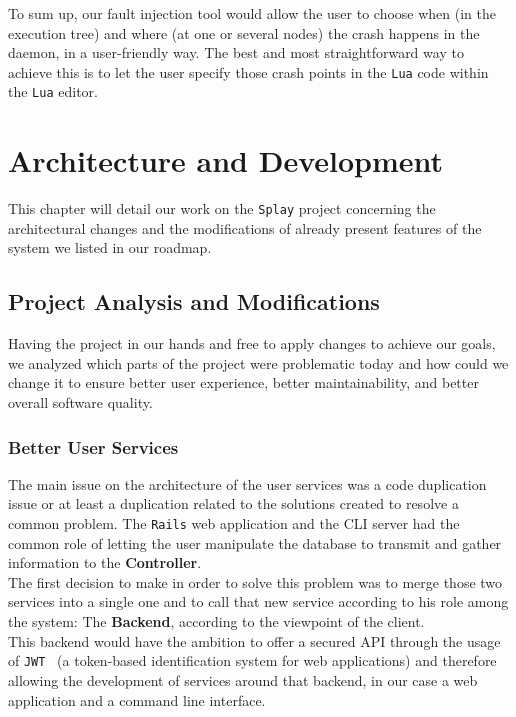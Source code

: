\documentclass{eplmastersthesis}
\begin{document}
          To sum up, our fault injection tool would allow the user to choose
          when (in the execution tree) and where (at one or several nodes) the
          crash happens in the daemon, in a user-friendly way. The best and
          most straightforward way to achieve this is to let
          the user specify those crash points in the \texttt{Lua} code within the \texttt{Lua}
          editor.

  \chapter{Architecture and Development}
  \label{chap:dev}

    This chapter will detail our work on the \texttt{Splay} project concerning the
    architectural changes and the modifications of already present features
    of the system we listed in our roadmap.

    \section{Project Analysis and Modifications}

      Having the project in our hands and free to apply changes to achieve our
      goals, we analyzed which parts of the project were problematic today and
      how could we change it to ensure better user experience, better
      maintainability, and better overall software quality.

      \subsection{Better User Services}

        The main issue on the architecture of the user services was a code
        duplication issue or at least a duplication related to the solutions
        created to resolve a common problem. The \texttt{Rails} web application and the
        CLI server had the common role of letting the user manipulate the
        database to transmit and gather information to the \textbf{Controller}.\\

        The first decision to make in order to solve this problem was to
        merge those two services into a single one and to call that new
        service according to his role among the system: The \textbf{Backend},
        according to the viewpoint of the client.\\
        This backend would have the ambition to offer a secured API through
        the usage of \texttt{JWT}~\cite{JWT} (a token-based identification system
        for web applications) and therefore allowing the development
        of services around that backend, in our case a web application and
        a command line interface.\\
\end{document}

